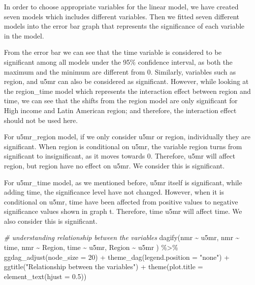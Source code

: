\documentclass[
]{article}
\newenvironment{Shaded}{\begin{snugshade}}{\end{snugshade}}
\newcommand{\AttributeTok}[1]{\textcolor[rgb]{0.77,0.63,0.00}{#1}}
\newcommand{\CommentTok}[1]{\textcolor[rgb]{0.56,0.35,0.01}{\textit{#1}}}
\newcommand{\DecValTok}[1]{\textcolor[rgb]{0.00,0.00,0.81}{#1}}
\newcommand{\FloatTok}[1]{\textcolor[rgb]{0.00,0.00,0.81}{#1}}
\newcommand{\FunctionTok}[1]{\textcolor[rgb]{0.00,0.00,0.00}{#1}}
\newcommand{\NormalTok}[1]{#1}
\newcommand{\SpecialCharTok}[1]{\textcolor[rgb]{0.00,0.00,0.00}{#1}}
\newcommand{\StringTok}[1]{\textcolor[rgb]{0.31,0.60,0.02}{#1}}
\begin{document}
In order to choose appropriate variables for the linear model, we have
created seven models which includes different variables. Then we fitted
seven different models into the error bar graph that represents the
significance of each variable in the model.

From the error bar we can see that the time variable is considered to be
significant among all models under the 95\% confidence interval, as both
the maximum and the minimum are different from 0. Similarly, variables
such as region, and u5mr can also be considered as significant. However,
while looking at the region\_time model which represents the interaction
effect between region and time, we can see that the shifts from the
region model are only significant for High income and Latin American
region; and therefore, the interaction effect should not be used here.

For u5mr\_region model, if we only consider u5mr or region, individually
they are significant. When region is conditional on u5mr, the variable
region turns from significant to insignificant, as it moves towards 0.
Therefore, u5mr will affect region, but region have no effect on u5mr.
We consider this is significant.

For u5mr\_time model, as we mentioned before, u5mr itself is
significant, while adding time, the significance level have not changed.
However, when it is conditional on u5mr, time have been affected from
positive values to negative significance values shown in graph t.
Therefore, time u5mr will affect time. We also consider this is
significant.

\begin{Shaded}
\begin{Highlighting}[]
\CommentTok{\# understanding relationship between the variables}
\FunctionTok{dagify}\NormalTok{(nmr }\SpecialCharTok{\textasciitilde{}}\NormalTok{ u5mr,}
\NormalTok{       nmr }\SpecialCharTok{\textasciitilde{}}\NormalTok{ time,}
\NormalTok{       nmr }\SpecialCharTok{\textasciitilde{}}\NormalTok{ Region,}
\NormalTok{       time }\SpecialCharTok{\textasciitilde{}}\NormalTok{ u5mr,}
\NormalTok{       Region }\SpecialCharTok{\textasciitilde{}}\NormalTok{ u5mr}
\NormalTok{       ) }\SpecialCharTok{\%\textgreater{}\%} 
  \FunctionTok{ggdag\_adjust}\NormalTok{(}\AttributeTok{node\_size =} \DecValTok{20}\NormalTok{) }\SpecialCharTok{+}
  \FunctionTok{theme\_dag}\NormalTok{(}\AttributeTok{legend.position =} \StringTok{"none"}\NormalTok{) }\SpecialCharTok{+}
  \FunctionTok{ggtitle}\NormalTok{(}\StringTok{"Relationship between the variables"}\NormalTok{) }\SpecialCharTok{+} 
  \FunctionTok{theme}\NormalTok{(}\AttributeTok{plot.title =} \FunctionTok{element\_text}\NormalTok{(}\AttributeTok{hjust =} \FloatTok{0.5}\NormalTok{))}
\end{Highlighting}
\end{Shaded}
\end{document}
